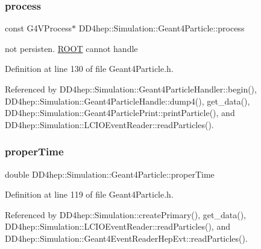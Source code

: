 \subsubsection{\texorpdfstring{process}{process}}
{\footnotesize\ttfamily const G4\+V\+Process$\ast$ D\+D4hep\+::\+Simulation\+::\+Geant4\+Particle\+::process}



not persisten. \hyperlink{namespace_r_o_o_t}{R\+O\+OT} cannot handle 



Definition at line 130 of file Geant4\+Particle.\+h.



Referenced by D\+D4hep\+::\+Simulation\+::\+Geant4\+Particle\+Handler\+::begin(), D\+D4hep\+::\+Simulation\+::\+Geant4\+Particle\+Handle\+::dump4(), get\+\_\+data(), D\+D4hep\+::\+Simulation\+::\+Geant4\+Particle\+Print\+::print\+Particle(), and D\+D4hep\+::\+Simulation\+::\+L\+C\+I\+O\+Event\+Reader\+::read\+Particles().

\hypertarget{class_d_d4hep_1_1_simulation_1_1_geant4_particle_a8799faf00417956ea2f814ee2ad086ee}{}\label{class_d_d4hep_1_1_simulation_1_1_geant4_particle_a8799faf00417956ea2f814ee2ad086ee} 
\subsubsection{\texorpdfstring{proper\+Time}{properTime}}
{\footnotesize\ttfamily double D\+D4hep\+::\+Simulation\+::\+Geant4\+Particle\+::proper\+Time}



Definition at line 119 of file Geant4\+Particle.\+h.



Referenced by D\+D4hep\+::\+Simulation\+::create\+Primary(), get\+\_\+data(), D\+D4hep\+::\+Simulation\+::\+L\+C\+I\+O\+Event\+Reader\+::read\+Particles(), and D\+D4hep\+::\+Simulation\+::\+Geant4\+Event\+Reader\+Hep\+Evt\+::read\+Particles().

\hypertarget{class_d_d4hep_1_1_simulation_1_1_geant4_particle_a2c169e0bf0dc706a43254c4c8ca9ccc2}{}\label{class_d_d4hep_1_1_simulation_1_1_geant4_particle_a2c169e0bf0dc706a43254c4c8ca9ccc2} 
